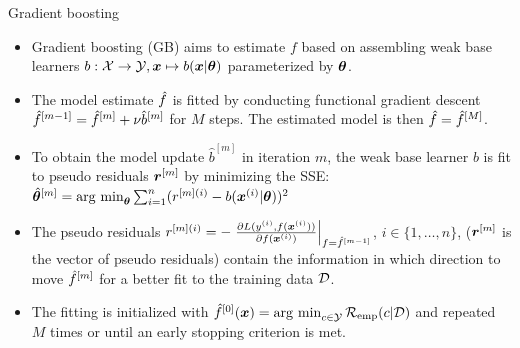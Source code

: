 \documentclass[t,10pt]{beamer}
\begin{document}
\begin{frame}{Gradient boosting}
  \begin{itemize}
    \item
      Gradient boosting (GB) aims to estimate $f$ based on assembling weak base learners $b:\mathcal{X} \to \mathcal{Y}, \bm{x} \mapsto b(\bm{x} | \bm{\theta})$ parameterized by $\bm{\theta}$.

    \item
      The model estimate $\hat{f}$ is fitted by conducting functional gradient descent $\hat{f}^{[m-1]} = \hat{f}^{[m]} + \nu \hat{b}^{[m]}$ for $M$ steps. The estimated model is then $\hat{f} = \hat{f}^{[M]}$.

    \item
      To obtain the model update $\hat{b}^{[m]}$ in iteration $m$, the weak base learner $b$ is fit to pseudo residuals $\bm{r}^{[m]}$ by minimizing the SSE: $\hat{\bm{\theta}}^{[m]} = \operatorname{arg~min}_{\bm{\theta}} \sum_{i=1}^n(r^{[m](i)} - b(\bm{x}^{(i)} | \bm{\theta}))^2$

    \item
      The pseudo residuals $r^{[m](i)} = -\left.\frac{\partial L(y^{(i)}, f(\bm{x}^{(i)}))}{\partial f(\bm{x}^{(i)})}\right|_{f = \hat{f}^{[m-1]}}$, $i \in \{1, \dots, n\}$, ($\bm{r}^{[m]}$ is the vector of pseudo residuals) contain the information in which direction to move $\hat{f}^{[m]}$ for a better fit to the training data $\mathcal{D}$.

    \item
      The fitting is initialized with $\hat{f}^{[0]}(\bm{x}) = \operatorname{arg~min}_{c\in\mathcal{Y}}\mathcal{R}_{\text{emp}}(c|\mathcal{D})$ and repeated $M$ times or until an early stopping criterion is met.
  \end{itemize}
\end{frame}
\end{document}
